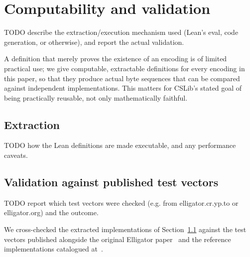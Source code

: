 \section{Computability and validation}
\label{sec:computability}

TODO describe the extraction/execution mechanism used
(Lean's eval, code generation, or otherwise), and report the
actual validation.

A definition that merely proves the existence of an encoding is of
limited practical use; we give computable, extractable definitions
for every encoding in this paper, so that they produce actual byte
sequences that can be compared against independent implementations.
This matters for CSLib's stated goal of being practically reusable,
not only mathematically faithful.

\subsection{Extraction}
\label{subsec:extraction}

TODO how the Lean definitions are made executable, and any
performance caveats.

\subsection{Validation against published test vectors}
\label{subsec:validation}

TODO report which test vectors were checked (e.g. from elligator.cr.yp.to or elligator.org) and the outcome.

We cross-checked the extracted implementations of
Section~\ref{subsec:extraction} against the test vectors published
alongside the original Elligator paper~\cite{elligatorcryptotests}
and the reference implementations catalogued at~\cite{elligatororg}.

